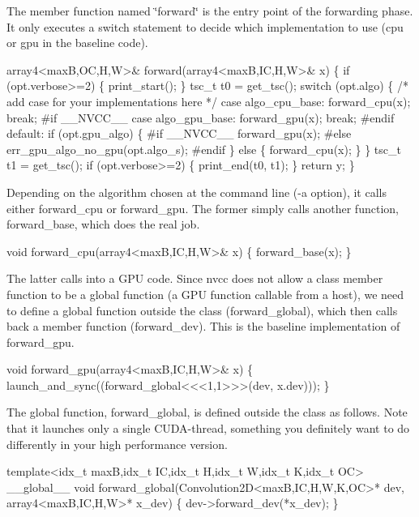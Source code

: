 The member function named \char`\"{}forward\char`\"{} is the entry point of the forwarding phase. It only executes a switch statement to decide which implementation to use (cpu or gpu in the baseline code).


\begin{DoxyCode}
  array4<maxB,OC,H,W>& forward(array4<maxB,IC,H,W>& x) \{
    if (opt.verbose>=2) \{ print\_start(); \}
    tsc\_t t0 = get\_tsc();
    switch (opt.algo) \{
      /* add case for your implementations here */
    case algo\_cpu\_base:
      forward\_cpu(x); break;
#if \_\_NVCC\_\_
    case algo\_gpu\_base:
      forward\_gpu(x); break;
#endif
    default:
      if (opt.gpu\_algo) \{
#if \_\_NVCC\_\_
        forward\_gpu(x);
#else
        err\_gpu\_algo\_no\_gpu(opt.algo\_s);
#endif
      \} else \{
        forward\_cpu(x);
      \}        
    \}
    tsc\_t t1 = get\_tsc();
    if (opt.verbose>=2) \{ print\_end(t0, t1); \}
    return y;
  \}
\end{DoxyCode}


Depending on the algorithm chosen at the command line (-\/a option), it calls either forward\+\_\+cpu or forward\+\_\+gpu. The former simply calls another function, forward\+\_\+base, which does the real job.


\begin{DoxyCode}
void forward\_cpu(array4<maxB,IC,H,W>& x) \{
  forward\_base(x);
\}
\end{DoxyCode}


The latter calls into a G\+PU code. Since nvcc does not allow a class member function to be a global function (a G\+PU function callable from a host), we need to define a global function outside the class (forward\+\_\+global), which then calls back a member function (forward\+\_\+dev). This is the baseline implementation of forward\+\_\+gpu.


\begin{DoxyCode}
void forward\_gpu(array4<maxB,IC,H,W>& x) \{
  launch\_and\_sync((forward\_global<<<1,1>>>(dev, x.dev)));
\}
\end{DoxyCode}


The global function, forward\+\_\+global, is defined outside the class as follows. Note that it launches only a single C\+U\+D\+A-\/thread, something you definitely want to do differently in your high performance version.


\begin{DoxyCode}
template<idx\_t maxB,idx\_t IC,idx\_t H,idx\_t W,idx\_t K,idx\_t OC>
\_\_global\_\_ void forward\_global(Convolution2D<maxB,IC,H,W,K,OC>* dev,
                               array4<maxB,IC,H,W>* x\_dev) \{
  dev->forward\_dev(*x\_dev);
\}
\end{DoxyCode}


